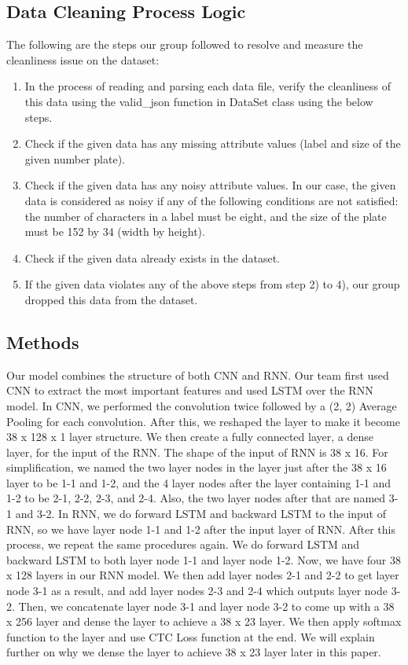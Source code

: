 \documentclass[conference]{IEEEtran}
\begin{document}
\subsection{Data Cleaning Process Logic}
The following are the steps our group followed to resolve and measure the cleanliness issue on the dataset:
\begin{enumerate}
\item In the process of reading and parsing each data file, verify the cleanliness of this data using the valid\_json function in DataSet class using the below steps.
\item Check if the given data has any missing attribute values (label and size of the given number plate).
\item Check if the given data has any noisy attribute values. In our case, the given data is considered as noisy if any of the following conditions are not satisfied: the number of characters in a label must be eight, and the size of the plate must be 152 by 34 (width by height).
\item Check if the given data already exists in the dataset.
\item If the given data violates any of the above steps from step 2) to 4), our group dropped this data from the dataset.
\end{enumerate}

\subsection{Methods}
Our model combines the structure of both CNN and RNN. Our team first used CNN to extract the most important features and used LSTM over the RNN model. In CNN, we performed the convolution twice followed by a (2, 2) Average Pooling for each convolution. After this, we reshaped the layer to make it become 38 x 128 x 1 layer structure. We then create a fully connected layer, a dense layer, for the input of the RNN. The shape of the input of RNN is 38 x 16. For simplification, we named the two layer nodes in the layer just after the 38 x 16 layer to be 1-1 and 1-2, and the 4 layer nodes after the layer containing 1-1 and 1-2 to be 2-1, 2-2, 2-3, and 2-4. Also, the two layer nodes after that are named 3-1 and 3-2. In RNN, we do forward LSTM and backward LSTM to the input of RNN, so we have layer node 1-1 and 1-2 after the input layer of RNN. After this process, we repeat the same procedures again. We do forward LSTM and backward LSTM to both layer node 1-1 and layer node 1-2. Now, we have four 38 x 128 layers in our RNN model. We then add layer nodes 2-1 and 2-2 to get layer node 3-1 as a result, and add layer nodes 2-3 and 2-4 which outputs layer node 3-2. Then, we concatenate layer node 3-1 and layer node 3-2 to come up with a 38 x 256 layer and dense the layer to achieve a 38 x 23 layer. We then apply softmax function to the layer and use CTC Loss function at the end. We will explain further on why we dense the layer to achieve 38 x 23 layer later in this paper.
\end{document}
